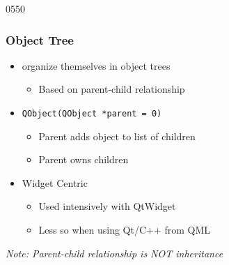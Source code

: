 \begin{slide}{0550} \label{parent_child} \frametitle{Object Tree}
\begin{itemize}
  \item {} organize themselves in object trees
    \begin{itemize}
    \item Based on parent-child relationship
    \end{itemize}\medskip

  \item \texttt{QObject(QObject *parent = 0)}
    \begin{itemize}
    \item Parent adds object to list of children
    \item Parent owns children
    \end{itemize}\medskip

  \item Widget Centric
    \begin{itemize}
    \item Used intensively with QtWidget
    \item Less so when using Qt/C++ from QML
    \end{itemize}
 \end{itemize}
 \medskip
  \textit{Note: Parent-child relationship is NOT inheritance}
\end{slide}


